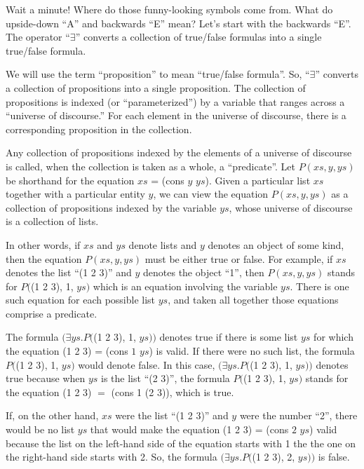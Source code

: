 Wait a minute! Where do those funny-looking symbols come from.
What do upside-down ``A'' and backwards ``E'' mean?
Let's start with the backwards ``E''.
The operator
\label{exists-def}
``$\exists$'' converts a collection of true/false formulas 
into a single true/false formula.

\label{proposition-def}
We will use the term ``proposition'' to mean ``true/false formula''.
So, ``$\exists$'' converts a collection of propositions
into a single proposition.
The collection of propositions is indexed (or ``parameterized'')
by a variable that ranges across a 
\label{universe-def}
``universe of discourse.''
For each element in the universe of discourse,
there is a corresponding proposition in the collection.

Any collection of propositions 
indexed by the elements of a universe of discourse is called,
when the collection is taken as a whole, a ``predicate''.
Let $P(xs, y, ys)$ be shorthand for the equation $xs$ = (cons $y$ $ys$).
Given a particular list $xs$ together with a particular entity $y$, 
we can view the equation $P(xs, y, ys)$ as a collection of propositions
indexed by the variable $ys$, whose universe of discourse is a collection of lists.

In other words, if $xs$ and $ys$ denote lists and 
$y$ denotes an object of some kind,
then the equation $P(xs, y, ys)$ must be either true or false.
For example, if $xs$ denotes the list ``(1 2 3)'' 
and $y$ denotes the object ``1'',
then $P(xs, y, ys)$ stands for $P($(1 2 3), 1, $ys)$
which is an equation involving the variable $ys$.
There is one such equation for each possible list $ys$,
and taken all together those equations comprise a predicate. 

The formula 
$(\exists ys.P($(1 2 3), 1, $ys))$ denotes true
if there is some list $ys$ 
for which the equation (1 2 3) = (cons $1$ $ys$) is valid.
If there were no such list, the formula $P($(1 2 3), 1, $ys)$  
would denote false.
In this case, $(\exists ys.P($(1 2 3), 1, $ys))$ denotes true
because when $ys$ is the list ``(2 3)'', the
formula $P($(1 2 3), 1, $ys)$ stands for the equation 
(1 2 3) $=$ (cons 1 (2 3)), which is true.

If, on the other hand, $xs$ were the list ``(1 2 3)''
and $y$ were the number ``2'', there would be no list
$ys$ that would make the equation (1 2 3) = (cons $2$ $ys$) valid
because the list on the left-hand side of the equation
starts with 1 the the one on the right-hand side starts with 2.
So, the formula $(\exists ys.P($(1 2 3), 2, $ys))$
is false.

